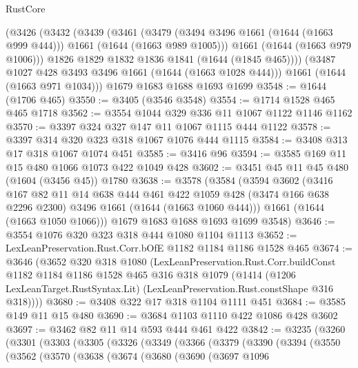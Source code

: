 \begin{lexlean}{RustCore}
\begin{coremodule}
    (@3426
      (@3432
        (@3439
          (@3461
            (@3479 (@3494 @3496 @1661 (@1644 (@1663 @999 @444))) @1661 (@1644 (@1663 @989 @1005)))
            @1661
            (@1644 (@1663 @979 @1006)))
          @1826
          @1829
          @1832
          @1836
          @1841
          (@1644 (@1845 @465))))
      (@3487 @1027 @428 @3493 @3496 @1661 (@1644 (@1663 @1028 @444)))
      @1661
      (@1644 (@1663 @971 @1034)))
    @1679
    @1683
    @1688
    @1693
    @1699
@3548 := @1644 (@1706 @465)
@3550 := @3405 (@3546 @3548)
@3554 := @1714 @1528 @465 @465 @1718
@3562 := @3554 @1044 @329 @336 @11 @1067 @1122 @1146 @1162
@3570 := @3397 @324 @327 @147 @11 @1067 @1115 @444 @1122
@3578 := @3397 @314 @320 @323 @318 @1067 @1076 @444 @1115
@3584 := @3408 @313 @17 @318 @1067 @1074 @451
@3585 := @3416 @96
@3594 := @3585 @169 @11 @15 @480 @1066 @1073 @422 @1049 @428
@3602 := @3451 @45 @11 @45 @480 (@1604 (@3456 @45)) @1780
@3638 := @3578
    (@3584
      (@3594
        @3602
        (@3416
          @167
          @82
          @11
          @14
          @638
          @444
          @461
          @422
          @1059
          @428
          (@3474 @166 @638 @2296 @2300)
          @3496
          @1661
          (@1644 (@1663 @1060 @444)))
        @1661
        (@1644 (@1663 @1050 @1066)))
      @1679
      @1683
      @1688
      @1693
      @1699
      @3548)
@3646 := @3554 @1076 @320 @323 @318 @444 @1080 @1104 @1113
@3652 := LexLeanPreservation.Rust.Corr.bOfE @1182 @1184 @1186 @1528 @465
@3674 := @3646
    (@3652
      @320
      @318
      @1080
      (LexLeanPreservation.Rust.Corr.buildConst
        @1182
        @1184
        @1186
        @1528
        @465
        @316
        @318
        @1079
        (@1414
          (@1206 LexLeanTarget.RustSyntax.Lit)
          (LexLeanPreservation.Rust.constShape @316 @318))))
@3680 := @3408 @322 @17 @318 @1104 @1111 @451
@3684 := @3585 @149 @11 @15 @480
@3690 := @3684 @1103 @1110 @422 @1086 @428 @3602
@3697 := @3462 @82 @11 @14 @593 @444 @461 @422
@3842 := @3235
    (@3260
      (@3301
        (@3303
          (@3305
            (@3326
              (@3349
                (@3366
                  (@3379
                    (@3390
                      (@3394
                        (@3550
                          (@3562
                            (@3570
                              (@3638
                                (@3674
                                  (@3680
                                    (@3690
                                      (@3697
                                        @1096

\end{coremodule}
\end{lexlean}
